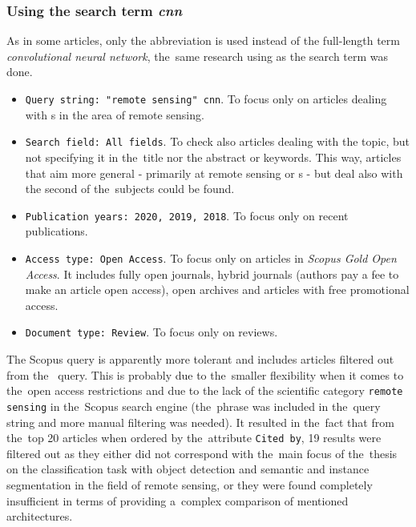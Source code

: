 \subsubsection{Using the search term \textit{cnn}}
\label{scopus-reviews-cnn}

As in some articles, only the abbreviation \textit{} is used instead of the full-length term \textit{convolutional neural network}, the~same research using \textit{} as the search term was done.

\begin{itemize}
	\item \verb|Query string: "remote sensing" cnn|. To focus only on articles dealing with s in the area of remote sensing.
	\item \verb|Search field: All fields|. To check also articles dealing with the topic, but not specifying it in the~title nor the abstract or keywords. This way, articles that aim more general - primarily at remote sensing or s - but deal also with the second of the~subjects could be found.
	\item \verb|Publication years: 2020, 2019, 2018|. To focus only on recent publications.
	\item \verb|Access type: Open Access|. To focus only on articles in \textit{Scopus Gold Open Access}. It includes fully open journals, hybrid journals (authors pay a fee to make an article open access), open archives and articles with free promotional access.
	\item \verb|Document type: Review|. To focus only on reviews.
\end{itemize}

\noindent The Scopus query is apparently more tolerant and includes articles filtered out from the~ query. This is probably due to the~smaller flexibility when it comes to the~open access restrictions and due to the lack of the scientific category \verb|remote sensing| in the~Scopus search engine (the~phrase was included in the~query string and more manual filtering was needed). It resulted in the~fact that from the~top 20 articles when ordered by the~attribute \verb|Cited by|, 19 results were filtered out as they either did not correspond with the~main focus of the~thesis on the classification task with object detection and semantic and instance segmentation in the field of remote sensing, or they were found completely insufficient in terms of providing a~complex comparison of mentioned architectures.

